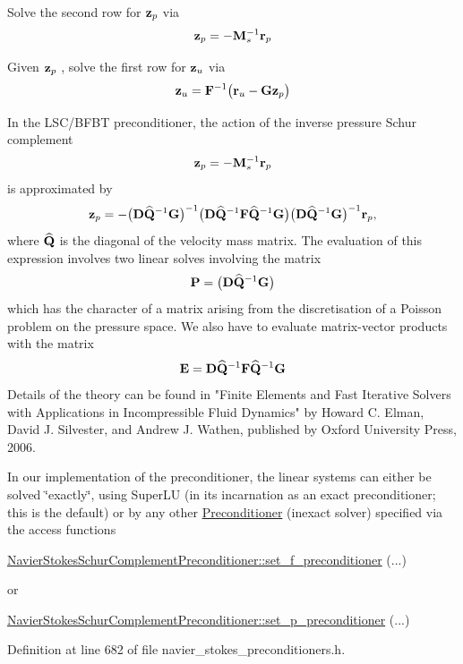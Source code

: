 \begin{DoxyEnumerate}
\item Solve the second row for $ {\bf z}_p$ via \[ {\bf z}_p = - {\bf M}_s^{-1} {\bf r}_p \]
\item Given $ {\bf z}_p $ , solve the first row for $ {\bf z}_u$ via \[ {\bf z}_u = {\bf F}^{-1} \big( {\bf r}_u - {\bf G} {\bf z}_p \big) \]
\end{DoxyEnumerate}In the L\+S\+C/\+B\+F\+BT preconditioner, the action of the inverse pressure Schur complement \[ {\bf z}_p = - {\bf M}_s^{-1} {\bf r}_p \] is approximated by \[ {\bf z}_p = - \big({\bf D} \widehat{\bf Q}^{-1}{\bf G} \big)^{-1} \big({\bf D} \widehat{\bf Q}^{-1}{\bf F} \widehat{\bf Q}^{-1}{\bf G}\big) \big({\bf D} \widehat{\bf Q}^{-1}{\bf G} \big)^{-1} {\bf r}_p, \] where $ \widehat{\bf Q} $ is the diagonal of the velocity mass matrix. The evaluation of this expression involves two linear solves involving the matrix \[ {\bf P} = \big({\bf D} \widehat{\bf Q}^{-1}{\bf G} \big) \] which has the character of a matrix arising from the discretisation of a Poisson problem on the pressure space. We also have to evaluate matrix-\/vector products with the matrix \[ {\bf E}={\bf D}\widehat{\bf Q}^{-1}{\bf F}\widehat{\bf Q}^{-1}{\bf G} \] Details of the theory can be found in "Finite Elements and Fast Iterative Solvers with Applications in Incompressible Fluid Dynamics" by Howard C. Elman, David J. Silvester, and Andrew J. Wathen, published by Oxford University Press, 2006.

In our implementation of the preconditioner, the linear systems can either be solved \char`\"{}exactly\char`\"{}, using Super\+LU (in its incarnation as an exact preconditioner; this is the default) or by any other \hyperlink{classoomph_1_1Preconditioner}{Preconditioner} (inexact solver) specified via the access functions 
\begin{DoxyCode}
\hyperlink{classoomph_1_1NavierStokesSchurComplementPreconditioner_ab2f387b87192dd2f7b6725cfe3aae44e}{NavierStokesSchurComplementPreconditioner::set\_f\_preconditioner}
      (...)
\end{DoxyCode}
 or 
\begin{DoxyCode}
\hyperlink{classoomph_1_1NavierStokesSchurComplementPreconditioner_a48f0d5e878eccab6e7f080c92d4bc6f5}{NavierStokesSchurComplementPreconditioner::set\_p\_preconditioner}
      (...)
\end{DoxyCode}
 

Definition at line 682 of file navier\+\_\+stokes\+\_\+preconditioners.\+h.



